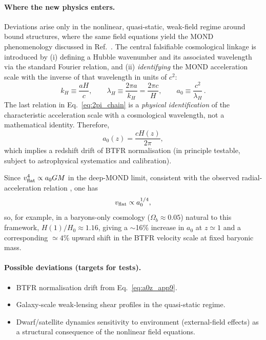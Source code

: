 \documentclass[11pt]{article}
\newcommand{\azero}{a_0}
\begin{document}
\paragraph{Where the new physics enters.}
Deviations arise only in the nonlinear, quasi-static, weak-field regime around bound
structures, where the same field equations yield the MOND phenomenology discussed in
Ref.~\cite{Lotishvili2026}. The central falsifiable cosmological linkage is introduced by (i) defining a Hubble wavenumber and its associated wavelength via the standard Fourier relation, and (ii) \emph{identifying} the MOND acceleration scale with the inverse of that wavelength in units of $c^2$:
\begin{equation}
k_H \equiv \frac{aH}{c},\qquad
\lambda_H \equiv \frac{2\pi a}{k_H}=\frac{2\pi c}{H},\qquad
\azero \equiv \frac{c^2}{\lambda_H}\,.
\label{eq:2pi_chain}
\end{equation}
\noindent The last relation in Eq.~\eqref{eq:2pi_chain} is a \emph{physical identification} of the characteristic acceleration scale with a cosmological wavelength, not a mathematical identity.
Therefore,
\begin{equation}
\azero(z)=\frac{cH(z)}{2\pi},
\label{eq:a0z_app9}
\end{equation}
which implies a redshift drift of BTFR normalisation (in principle testable, subject to
astrophysical systematics and calibration).

Since $v_{\rm flat}^4\propto \azero GM$ in the deep-MOND limit, consistent with the
observed radial-acceleration relation \cite{McGaugh2016}, one has
\begin{equation}
v_{\rm flat}\propto \azero^{1/4},
\label{eq:v_a0_quarter}
\end{equation}
so, for example, in a baryons-only cosmology ($\Omega_b\approx0.05$) natural to this framework, $H(1)/H_0\approx 1.16$, giving a $\sim$16\% increase in $\azero$ at $z\simeq 1$ and a corresponding $\simeq 4\%$ upward shift in the BTFR velocity scale at fixed baryonic mass.

\paragraph{Possible deviations (targets for tests).}
\begin{itemize}
\item BTFR normalisation drift from Eq.~\eqref{eq:a0z_app9}.
\item Galaxy-scale weak-lensing shear profiles in the quasi-static regime.
\item Dwarf/satellite dynamics sensitivity to environment (external-field effects) as a
structural consequence of the nonlinear field equations.
\end{itemize}
\end{document}
